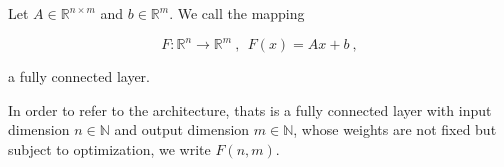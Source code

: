 \begin{definition}
    Let $A \in \mathbb R^{n \times m}$ and $b \in \mathbb R^m$. We call the mapping

        $$ F: \mathbb R^{n} \to \mathbb R^{m} ~, ~~ F(x) = Ax + b ~, $$

    a fully connected layer.
\end{definition}

In order to refer to the architecture,
thats is a fully connected layer with input dimension $n \in \mathbb N$ and output dimension $m \in \mathbb N$,
whose weights are not fixed but subject to optimization, 
we write $F(n, m)$.